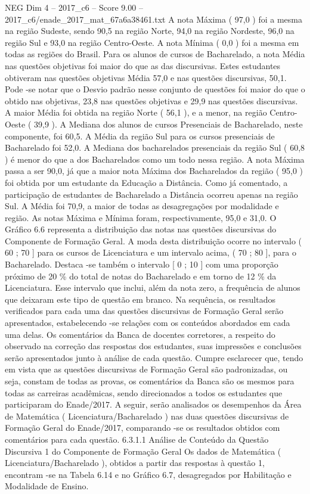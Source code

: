 \begin{textsample}{NEG Dim 4 – 2017\_c6 – Score 9.00 – 2017\_c6/enade\_2017\_mat\_67a6a38461.txt}
A nota Máxima ( 97,0 ) foi a mesma na região Sudeste, sendo 90,5 na região Norte, 94,0 na região Nordeste, 96,0 na região Sul e 93,0 na região Centro-Oeste.
A nota Mínima ( 0,0 ) foi a mesma em todas as regiões do Brasil.
Para os alunos de cursos de Bacharelado, a nota Média nas questões objetivas foi maior do que as das discursivas.
Estes estudantes obtiveram nas questões objetivas Média 57,0 e nas questões discursivas, 50,1.
Pode -se notar que o Desvio padrão nesse conjunto de questões foi maior do que o obtido nas objetivas, 23,8 nas questões objetivas e 29,9 nas questões discursivas.
A maior Média foi obtida na região Norte ( 56,1 ), e a menor, na região Centro-Oeste ( 39,9 ).
A Mediana dos alunos de cursos Presenciais de Bacharelado, neste componente, foi 60,5.
A Média da região Sul para os cursos presenciais de Bacharelado foi 52,0.
A Mediana dos bacharelados presenciais da região Sul ( 60,8 ) é menor do que a dos Bacharelados como um todo nessa região.
A nota Máxima passa a ser 90,0, já que a maior nota Máxima dos Bacharelados da região ( 95,0 ) foi obtida por um estudante da Educação a Distância.
Como já comentado, a participação de estudantes de Bacharelado a Distância ocorreu apenas na região Sul.
A Média foi 70,9, a maior de todas as desagregações por modalidade e região.
As notas Máxima e Mínima foram, respectivamente, 95,0 e 31,0.
O Gráfico 6.6 representa a distribuição das notas nas questões discursivas do Componente de Formação Geral.
A moda desta distribuição ocorre no intervalo ( 60 ; 70 ] para os cursos de Licenciatura e um intervalo acima, ( 70 ; 80 ], para o Bacharelado.
Destaca -se também o intervalo [ 0 ; 10 ] com uma proporção próximo de 20 \% do total de notas do Bacharelado e em torno de 12 \% da Licenciatura.
Esse intervalo que inclui, além da nota zero, a frequência de alunos que deixaram este tipo de questão em branco.
Na sequência, os resultados verificados para cada uma das questões discursivas de Formação Geral serão apresentados, estabelecendo -se relações com os conteúdos abordados em cada uma delas.
Os comentários da Banca de docentes corretores, a respeito do observado na correção das respostas dos estudantes, suas impressões e conclusões serão apresentados junto à análise de cada questão.
Cumpre esclarecer que, tendo em vista que as questões discursivas de Formação Geral são padronizadas, ou seja, constam de todas as provas, os comentários da Banca são os mesmos para todas as carreiras acadêmicas, sendo direcionados a todos os estudantes que participaram do Enade/2017.
A seguir, serão analisados os desempenhos da Área de Matemática ( Licenciatura/Bacharelado ) nas duas questões discursivas de Formação Geral do Enade/2017, comparando -se os resultados obtidos com comentários para cada questão. 6.3.1.1 Análise de Conteúdo da Questão Discursiva 1 do Componente de Formação Geral Os dados de Matemática ( Licenciatura/Bacharelado ), obtidos a partir das respostas à questão 1, encontram -se na Tabela 6.14 e no Gráfico 6.7, desagregados por Habilitação e Modalidade de Ensino.

\end{textsample}
